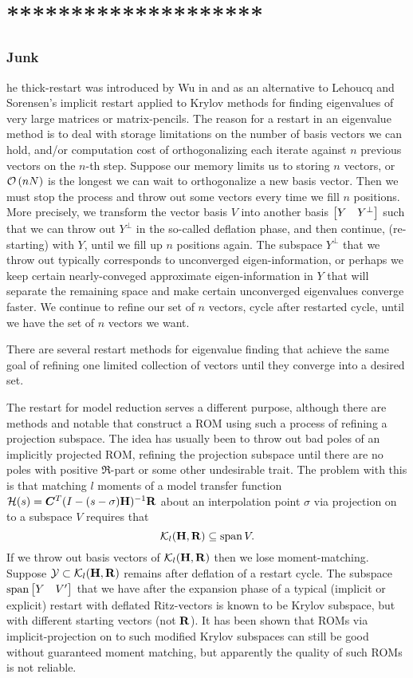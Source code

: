 \part{********************}
 \clearpage
\section{Junk}
\label{sec:thick_theory} 
he thick-restart was introduced by Wu  in \cite{dynamicthick}  and \cite{wu1999thick} as an alternative to Lehoucq and Sorensen's implicit restart applied to Krylov methods for finding eigenvalues of very large matrices or matrix-pencils.  The reason for a restart in an eigenvalue method is to deal with storage limitations on the number of basis vectors we can hold, and/or computation cost of orthogonalizing each iterate against $n$ previous vectors on the $n$-th step.   Suppose our memory limits us to storing $n$ vectors, or $\mathcal{O}\left( nN \right)$ is the longest we can wait to orthogonalize a new basis vector.   Then we must stop the process and throw out some vectors every time we fill $n$ positions.  More precisely, we transform the vector basis $V$ into another basis $\begin{bmatrix} Y & Y^\perp\end{bmatrix}$ such that we can throw out $Y^\perp$ in the so-called deflation phase, and then continue, (re-starting) with $Y$, until we fill up $n$ positions again.   The subspace $Y^\perp$ that we throw out typically corresponds to unconverged eigen-information, or perhaps we keep certain nearly-conveged approximate eigen-information in $Y$ that will separate the remaining space and make certain unconverged eigenvalues converge faster.   We continue to refine our set of $n$ vectors, cycle after restarted cycle, until we have the set of $n$ vectors we want.  

There are several restart methods for eigenvalue finding that achieve the same goal of refining one limited collection of vectors until they converge into a desired set. 
\smallskip

The restart for model reduction serves a different purpose, although there are methods \cite{jaimoukha1997implicitMOR} and notable \cite{grimme1996restart} that construct a ROM using such a process of refining a projection subspace.  The idea has usually been to throw out bad poles of an implicitly projected ROM, refining the projection subspace until there are no poles with positive $\Re$-part or some other undesirable trait.   The problem with this is that matching $l$ moments of a model transfer function $\mathcal{H}(s)=\bm{C}^T(I-(s-\sigma)\textbf{\textup{H}})^{-1}\textbf{\textup{R}}$ about an interpolation point $\sigma$ via projection on to a subspace $V$ requires that 
\[
\mathcal{K}_{l}({\textbf{\textup{H}}},{\textbf{\textup{R}}}) \subseteq \operatorname*{span} V.
\] 
If we throw out basis vectors of $\mathcal{K}_{l}({\textbf{\textup{H}}},{\textbf{\textup{R}}})$ then we lose moment-matching.  Suppose $\mathcal{Y} \subset \mathcal{K}_{l}({\textbf{\textup{H}}},{\textbf{\textup{R}}})$ remains after deflation of a restart cycle.  The subspace  $\operatorname*{span}\begin{bmatrix} Y&V^\prime\end{bmatrix}$ that we have after the expansion phase of a typical (implicit or explicit) restart  with deflated Ritz-vectors is known to be  Krylov subspace, but with different starting vectors (not $\textbf{\textup{R}}$).   It has been shown that ROMs via implicit-projection on to such modified Krylov subspaces can still be good without guaranteed moment matching, but apparently the quality of such ROMs is not reliable.     


